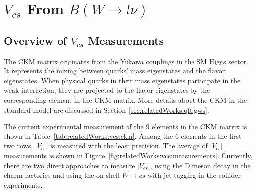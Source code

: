 
\section{$V_{cs}$ From $B(W\to l \nu)$ }
\label{sec:relatedWorks:vcs}

\subsection{Overview of $V_{cs}$ Measurements}

The CKM matrix originates from the Yukawa couplings in the SM Higgs sector. It represents the mixing between quarks' mass eigenstates and the flavor eigenstates. When physical quarks in their mass eigenstates participate in the weak interaction, they are projected to the flavor eigenstates by the corresponding element in the CKM matrix. More details about the CKM in the standard model are discussed in Section~\ref{sec:relatedWorks:qft:gws}. 

\begin{table}[ht]
    \centering
    \setlength{\tabcolsep}{1.5em}
    \renewcommand{\arraystretch}{1.5}
    \caption{The current experimental world average of the 9 elements in the CKM matrix in the PDG \cite{pdg2020}.  }
    \label{tab:relatedWorks:vcs:ckm}
\end{table}


The current experimental measurement of the 9 elements in the CKM matrix \cite{pdg2020} is shown in Table~\ref{tab:relatedWorks:vcs:ckm}. Among the 6 elements in the first two rows, $|V_{cs}|$ is measured with the least precision. The average of $|V_{cs}|$ measurements is shown in Figure~\ref{fig:relatedWorks:vcs:measurements}. Currently, there are two direct approaches to measure $|V_{cs}|$, using the D meson decay in the charm factories and using the on-shell $W\to c s$  with jet tagging in the collider experiments.

